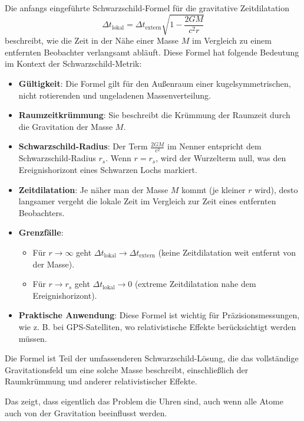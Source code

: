 \documentclass[a4paper,12pt]{article}
\begin{document}
	Die anfangs eingeführte Schwarzschild-Formel für die gravitative Zeitdilatation
	\[
	\Delta t_{\text{lokal}} = \Delta t_{\text{extern}} \sqrt{1 - \frac{2 G M}{c^2 r}}
	\]
	beschreibt, wie die Zeit in der Nähe einer Masse \( M \) im Vergleich zu einem entfernten Beobachter verlangsamt abläuft. Diese Formel hat folgende Bedeutung im Kontext der Schwarzschild-Metrik:
	\begin{itemize}
		\item \textbf{Gültigkeit}: Die Formel gilt für den Außenraum einer kugelsymmetrischen, nicht rotierenden und ungeladenen Massenverteilung.
		\item \textbf{Raumzeitkrümmung}: Sie beschreibt die Krümmung der Raumzeit durch die Gravitation der Masse \( M \).
		\item \textbf{Schwarzschild-Radius}: Der Term \( \frac{2 G M}{c^2} \) im Nenner entspricht dem Schwarzschild-Radius \( r_s \). Wenn \( r = r_s \), wird der Wurzelterm null, was den Ereignishorizont eines Schwarzen Lochs markiert.
		\item \textbf{Zeitdilatation}: Je näher man der Masse \( M \) kommt (je kleiner \( r \) wird), desto langsamer vergeht die lokale Zeit im Vergleich zur Zeit eines entfernten Beobachters.
		\item \textbf{Grenzfälle}:
		\begin{itemize}
			\item Für \( r \to \infty \) geht \( \Delta t_{\text{lokal}} \to \Delta t_{\text{extern}} \) (keine Zeitdilatation weit entfernt von der Masse).
			\item Für \( r \to r_s \) geht \( \Delta t_{\text{lokal}} \to 0 \) (extreme Zeitdilatation nahe dem Ereignishorizont).
		\end{itemize}
		\item \textbf{Praktische Anwendung}: Diese Formel ist wichtig für Präzisionsmessungen, wie z. B. bei GPS-Satelliten, wo relativistische Effekte berücksichtigt werden müssen.
	\end{itemize}
	Die Formel ist Teil der umfassenderen Schwarzschild-Lösung, die das vollständige Gravitationsfeld um eine solche Masse beschreibt, einschließlich der Raumkrümmung und anderer relativistischer Effekte.
	
	Das zeigt, dass eigentlich das Problem die Uhren sind, auch wenn alle Atome auch von der Gravitation beeinflusst werden.
	
\end{document}
